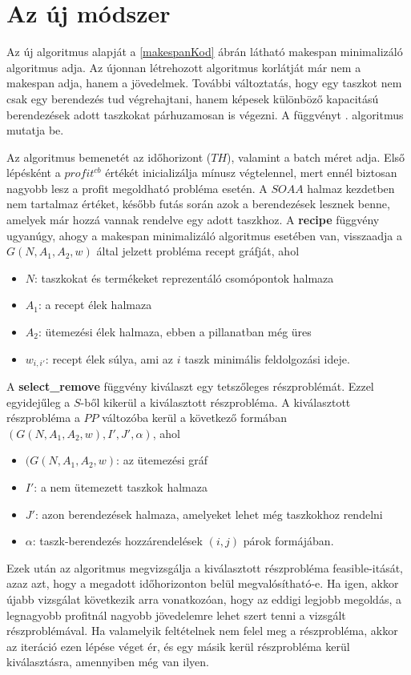 \chapter{Az új módszer}
Az új algoritmus alapját a \ref{makespanKod} ábrán látható makespan minimalizáló algoritmus adja. Az újonnan létrehozott algoritmus korlátját már nem a makespan adja, hanem a jövedelmek. További változtatás, hogy egy taszkot nem csak egy berendezés tud végrehajtani, hanem képesek különböző kapacitású berendezések adott taszkokat párhuzamosan is végezni. A függvényt . algoritmus mutatja be.

Az algoritmus bemenetét az időhorizont ($TH$), valamint a batch méret adja. Első lépésként a $profit^{cb}$ értékét inicializálja mínusz végtelennel, mert ennél biztosan nagyobb lesz a profit megoldható probléma esetén. A $SOAA$ halmaz kezdetben nem tartalmaz értéket, később futás során azok a berendezések lesznek benne, amelyek már hozzá vannak rendelve egy adott taszkhoz. A \textbf{recipe} függvény ugyanúgy, ahogy a makespan minimalizáló algoritmus esetében van, visszaadja a $G(N,A_1,A_2,w)$ által jelzett probléma recept gráfját, ahol
\begin{itemize}
  \item[] $N$: taszkokat és termékeket reprezentáló csomópontok halmaza	
  \item[] $A_1$: a recept élek halmaza
  \item[] $A_2$: ütemezési élek halmaza, ebben a pillanatban még üres
  \item[] $w_{i,i'}$: recept élek súlya, ami az $i$ taszk minimális feldolgozási ideje.
\end{itemize} 

A \textbf{select\_remove} függvény kiválaszt egy tetszőleges részproblémát. Ezzel egyidejűleg a $S$-ből kikerül a kiválasztott részprobléma. A kiválasztott részprobléma a $PP$ változóba kerül a következő formában  $(G(N,A_1,A_2,w),I',J',\alpha)$, ahol 
\begin{itemize}
  \item[] $(G(N,A_1,A_2,w)$: az ütemezési gráf	
  \item[] $I'$: a nem ütemezett taszkok halmaza
  \item[] $J'$: azon berendezések halmaza, amelyeket lehet még taszkokhoz rendelni
  \item[] $\alpha$: taszk-berendezés hozzárendelések $(i,j)$ párok formájában.
\end{itemize}

Ezek után az algoritmus megvizsgálja a kiválasztott részprobléma feasible-itását, azaz azt, hogy a megadott időhorizonton belül megvalósítható-e. Ha igen, akkor újabb vizsgálat következik arra vonatkozóan, hogy az eddigi legjobb megoldás, a legnagyobb profitnál nagyobb jövedelemre lehet szert tenni a vizsgált részproblémával. Ha valamelyik feltételnek nem felel meg a részprobléma, akkor az iteráció ezen lépése véget ér, és egy másik kerül részprobléma kerül kiválasztásra, amennyiben még van ilyen.

